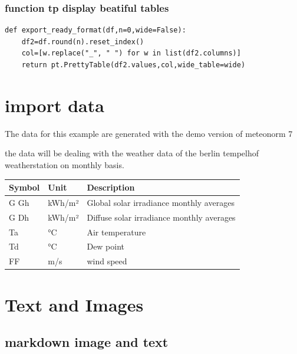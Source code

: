 \documentclass[reprint, floatfix, groupaddress, prb]{article}
\begin{document}
    \hypertarget{function-tp-display-beatiful-tables}{%
\subsubsection{function tp display beatiful
tables}\label{function-tp-display-beatiful-tables}}

    \begin{verbatim}
def export_ready_format(df,n=0,wide=False):
    df2=df.round(n).reset_index()
    col=[w.replace("_", " ") for w in list(df2.columns)]
    return pt.PrettyTable(df2.values,col,wide_table=wide)
\end{verbatim}

    \hypertarget{import-data}{%
\section{import data}\label{import-data}}

    The data for this example are generated with the demo version of
meteonorm 7

the data will be dealing with the weather data of the berlin tempelhof
weatherstation on monthly basis.

    
        
    \begin{table}[ht] 
\begin{tabular}[l]{lll}
\toprule
Symbol & Unit & Description\\ 
\midrule
G Gh & kWh/m² & Global solar irradiance monthly averages\\ 
G Dh & kWh/m² & Diffuse solar irradiance monthly averages\\ 
Ta & °C & Air temperature\\ 
Td & °C & Dew point\\ 
FF & m/s & wind speed\\ 
\bottomrule 
 \end{tabular}
\end{table}

    
    

    \hypertarget{text-and-images}{%
\section{Text and Images}\label{text-and-images}}

    \hypertarget{markdown-image-and-text}{%
\subsection{markdown image and text}\label{markdown-image-and-text}}
\end{document}
